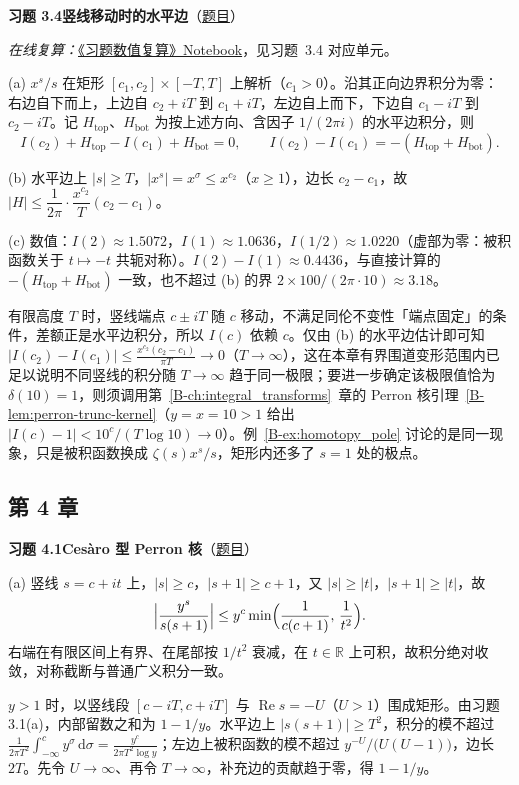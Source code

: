 \documentclass[11pt,a4paper]{article}
\newcommand{\RR}{\mathbb{R}}
\newcommand{\dd}{\,\mathrm{d}}
\renewcommand{\Re}{\operatorname{Re}}
\newcommand{\bref}[1]{\ref*{B-#1}}
\newcommand{\Sol}[2]{%
  \par\addvspace{1.2em}\noindent
  \hypertarget{s:#1}{}\textbf{习题 #1\quad #2}\hfill{\small（\hyperlink{q:#1}{题目}）}\par
  \nopagebreak\smallskip}
\begin{document}
\Sol{3.4}{竖线移动时的水平边}
\emph{在线复算：}\href{https://colab.research.google.com/github/lichengtong123/lichengtong-RH/blob/main/\%E4\%B9\%A0\%E9\%A2\%98\%E4\%B8\%8E\%E8\%A7\%A3\%E7\%AD\%94/\%E4\%B9\%A0\%E9\%A2\%98\%E6\%95\%B0\%E5\%80\%BC\%E5\%A4\%8D\%E7\%AE\%97.ipynb}{《习题数值复算》Notebook}，见习题~3.4 对应单元。

(a) $x^s/s$ 在矩形 $[c_1,c_2]\times[-T,T]$ 上解析（$c_1>0$）。沿其正向边界积分为零：右边自下而上，上边自 $c_2+iT$ 到 $c_1+iT$，左边自上而下，下边自 $c_1-iT$ 到 $c_2-iT$。记 $H_{\mathrm{top}}$、$H_{\mathrm{bot}}$ 为按上述方向、含因子 $1/(2\pi i)$ 的水平边积分，则
\[
  I(c_2)+H_{\mathrm{top}}-I(c_1)+H_{\mathrm{bot}}=0,\qquad I(c_2)-I(c_1)=-(H_{\mathrm{top}}+H_{\mathrm{bot}}).
\]

(b) 水平边上 $|s|\ge T$，$|x^s|=x^\sigma\le x^{c_2}$（$x\ge1$），边长 $c_2-c_1$，故 $|H|\le\dfrac{1}{2\pi}\cdot\dfrac{x^{c_2}}{T}(c_2-c_1)$。

(c) 数值：$I(2)\approx1.5072$，$I(1)\approx1.0636$，$I(1/2)\approx1.0220$（虚部为零：被积函数关于 $t\mapsto-t$ 共轭对称）。$I(2)-I(1)\approx0.4436$，与直接计算的 $-(H_{\mathrm{top}}+H_{\mathrm{bot}})$ 一致，也不超过 (b) 的界 $2\times100/(2\pi\cdot10)\approx3.18$。

有限高度 $T$ 时，竖线端点 $c\pm iT$ 随 $c$ 移动，不满足同伦不变性「端点固定」的条件，差额正是水平边积分，所以 $I(c)$ 依赖 $c$。仅由 (b) 的水平边估计即可知 $|I(c_2)-I(c_1)|\le\frac{x^{c_2}(c_2-c_1)}{\pi T}\to0$（$T\to\infty$），这在本章有界围道变形范围内已足以说明不同竖线的积分随 $T\to\infty$ 趋于同一极限；要进一步确定该极限值恰为 $\delta(10)=1$，则须调用第~\bref{ch:integral_transforms}~章的 Perron 核引理~\bref{lem:perron-trunc-kernel}（$y=x=10>1$ 给出 $|I(c)-1|<10^c/(T\log10)\to0$）。例~\bref{ex:homotopy_pole} 讨论的是同一现象，只是被积函数换成 $\zeta(s)x^s/s$，矩形内还多了 $s=1$ 处的极点。

\subsection*{第 4 章}

\Sol{4.1}{Cesàro 型 Perron 核}
(a) 竖线 $s=c+it$ 上，$|s|\ge c$，$|s+1|\ge c+1$，又 $|s|\ge|t|$，$|s+1|\ge|t|$，故
\[
  \Bigl|\frac{y^s}{s(s+1)}\Bigr|\le y^c\min\Bigl(\frac1{c(c+1)},\,\frac1{t^2}\Bigr).
\]
右端在有限区间上有界、在尾部按 $1/t^2$ 衰减，在 $t\in\RR$ 上可积，故积分绝对收敛，对称截断与普通广义积分一致。

$y>1$ 时，以竖线段 $[c-iT,c+iT]$ 与 $\Re s=-U$（$U>1$）围成矩形。由习题 3.1(a)，内部留数之和为 $1-1/y$。水平边上 $|s(s+1)|\ge T^2$，积分的模不超过 $\frac1{2\pi T^2}\int_{-\infty}^cy^\sigma\dd\sigma=\frac{y^c}{2\pi T^2\log y}$；左边上被积函数的模不超过 $y^{-U}/\bigl(U(U-1)\bigr)$，边长 $2T$。先令 $U\to\infty$、再令 $T\to\infty$，补充边的贡献趋于零，得 $1-1/y$。
\end{document}
